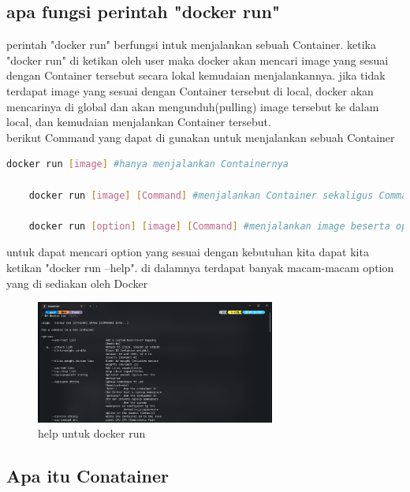 \documentclass[11pt,a4paper]{article}
\begin{document}
\subsection*{apa fungsi perintah "docker run"}
perintah "docker run" berfungsi intuk menjalankan sebuah Container. ketika "docker run" di ketikan 
oleh user maka docker akan mencari image yang sesuai dengan Container tersebut
secara lokal kemudaian menjalankannya. jika tidak terdapat image yang sesuai dengan Container tersebut di local,
docker akan mencarinya di global dan akan mengunduh(pulling) image tersebut ke dalam local, dan kemudaian menjalankan
Container tersebut.\\
berikut Command yang dapat di gunakan untuk menjalankan sebuah Container
\begin{lstlisting}[language = bash]
	docker run [image] #hanya menjalankan Containernya

	docker run [image] [Command] #menjalankan Container sekaligus Commandnya (contoh Command = echo)

	docker run [option] [image] [Command] #menjalankan image beserta option yang terdapat pada docker(Contoh option = -i)
\end{lstlisting}
untuk dapat mencari option yang sesuai dengan kebutuhan kita dapat kita ketikan "docker run --help".
di dalamnya terdapat banyak macam-macam option yang di sediakan oleh Docker
\begin{figure}[h]
	\centering
	\includegraphics[width = 0.7\textwidth]{Figure/asset/help run.png}
	\caption{help untuk docker run}
\end{figure}

\newpage


\subsection*{Apa itu Conatainer}
\end{document}
